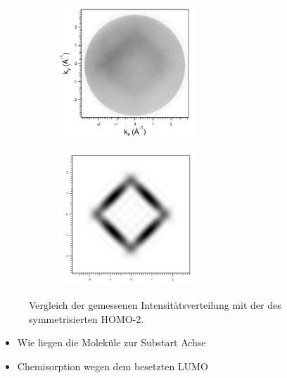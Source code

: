                 \begin{figure}
                    \centering
                    \begin{subfigure}[t]{0.48\textwidth}
                        \centering
                        \includegraphics[height=5cm]{./content/pictures/FeO+5A/FeO_5A_30_95eV.png}
                    \end{subfigure}
                    \begin{subfigure}[t]{0.48\textwidth}
                        \centering
                        \includegraphics[height=5cm]{./content/pictures/FeO+5A/MO_HOMO2_RT_RT.png}
                    \end{subfigure}
                    \caption{Vergleich der gemessenen Intensitätsverteilung mit der des symmetrisierten HOMO-2.}
                    \label{fig:FeO5A4}
                \end{figure}

                \begin{itemize}
                    \item Wie liegen die Moleküle zur Substart Achse
                    \item Chemisorption wegen dem besetzten LUMO
                \end{itemize}

